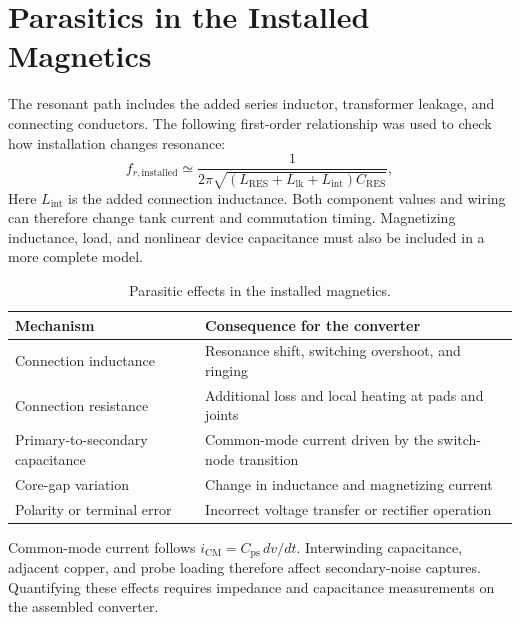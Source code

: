 \section{Parasitics in the Installed Magnetics}
\label{sec:mag-parasitics}

The resonant path includes the added series inductor, transformer leakage, and connecting conductors. The following first-order relationship was used to check how installation changes resonance:
\begin{equation}
 f_{r,\mathrm{installed}}\simeq
 \frac{1}{2\pi\sqrt{(L_{\mathrm{RES}}+L_{\mathrm{lk}}+L_{\mathrm{int}})C_{\mathrm{RES}}}},
 \label{eq:mag-installed-resonance}
\end{equation}
Here \(L_{\mathrm{int}}\) is the added connection inductance. Both component values and wiring can therefore change tank current and commutation timing. Magnetizing inductance, load, and nonlinear device capacitance must also be included in a more complete model.

\begin{table}[htbp]
\centering
\caption{Parasitic effects in the installed magnetics.}
\label{tab:mag-parasitic-mechanisms}
\begin{tabularx}{\textwidth}{@{}p{}X@{}}
\toprule
Mechanism & Consequence for the converter\\
\midrule
Connection inductance & Resonance shift, switching overshoot, and ringing\\
Connection resistance & Additional loss and local heating at pads and joints\\
Primary-to-secondary capacitance & Common-mode current driven by the switch-node transition\\
Core-gap variation & Change in inductance and magnetizing current\\
Polarity or terminal error & Incorrect voltage transfer or rectifier operation\\
\bottomrule
\end{tabularx}
\end{table}

Common-mode current follows \(i_{\mathrm{CM}}=C_{\mathrm{ps}}\,dv/dt\). Interwinding capacitance, adjacent copper, and probe loading therefore affect secondary-noise captures. Quantifying these effects requires impedance and capacitance measurements on the assembled converter.
